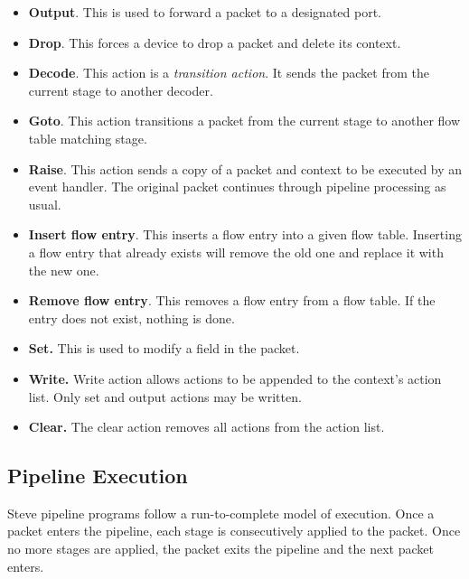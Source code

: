 \begin{itemize}

\item \textbf{Output}. This is used to forward a packet to a designated port.

\item \textbf{Drop}. This forces a device to drop a packet and delete its context.

\item \textbf{Decode}. This action is a \emph{transition action}. It sends the
packet from the current stage to another decoder.

\item \textbf{Goto}. This action transitions a packet from the current stage
to another flow table matching stage.

\item \textbf{Raise}. This action sends a copy of a packet and context to
be executed by an event handler. 
The original packet continues through pipeline processing as usual.

\item \textbf{Insert flow entry}. This inserts a flow entry into
a given flow table.
Inserting a flow entry that already exists will
remove the old one and replace it with the new one. 

\item \textbf{Remove flow entry}. This removes a flow entry from a flow table.
If the entry does not exist, nothing is done.

\item \textbf{Set.} This is used to modify a field in the packet.

\item \textbf{Write.} Write action allows actions to be appended to the context's
action list. Only set and output actions may be written.

\item \textbf{Clear.} The clear action removes all actions from the action list.

\end{itemize}

\subsection{Pipeline Execution}

Steve pipeline programs follow a run-to-complete model of execution. Once a
packet enters the pipeline, each stage is consecutively applied to
the packet. Once no more stages are applied, the packet exits the pipeline and
the next packet enters.


